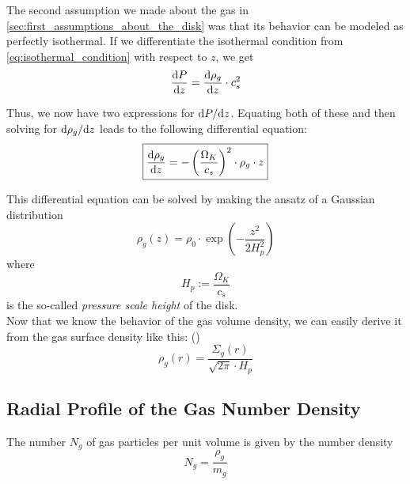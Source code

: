         The second assumption we made about the gas in \cref{sec:first_assumptions_about_the_disk}
        was that its behavior can be modeled as perfectly isothermal. If we differentiate the 
        isothermal condition from 
        \cref{eq:isothermal_condition} with respect to $z$, we get
        \begin{equation}
            \frac{\text{d} P}{\text{d} z} = \frac{\text{d} \rho_g}{\text{d} z}\cdot c_s^2
        \end{equation}

        Thus, we now have two expressions for $\text dP/\text dz$. Equating both of these and then 
        solving for $\text d\rho_g/\text dz$ leads to the following differential equation:
        \begin{equation}
            \boxed{\frac{\text{d} \rho_g}{\text{d} z} = - \left(\frac{\Omega_K}{c_s}\right)^2 \cdot \rho_g \cdot z}
        \end{equation}

        This differential equation can be solved by making the ansatz of a Gaussian distribution
        \begin{equation}
            \boxed{\rho_g(z) = \rho_0\cdot\exp\left(-\frac{z^2}{2H_p^2}\right)}
        \end{equation}
        where
        \begin{equation}
            H_p :=\frac{\Omega_K}{c_s}
        \end{equation}
        is the so-called \textit{pressure scale height} of the disk. \\

        Now that we know the behavior of the gas volume density, we can easily derive it from 
        the gas surface density like this: ()
        \begin{equation}
            \boxed{\rho_g(r) =\frac{\Sigma_g(r)}{\sqrt{2\pi}\cdot H_p}}
        \end{equation}

    \subsection{Radial Profile of the Gas Number Density}

        The number $N_g$ of gas particles per unit volume is given by the number density
        \begin{equation}
            N_g
                =\frac{\rho_g}{m_g}
        \end{equation}

